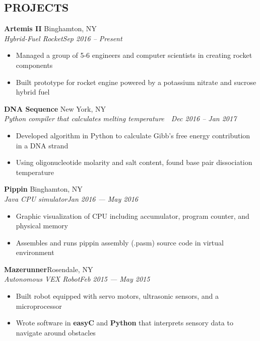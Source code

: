 \documentclass[10pt]{article}
\begin{document}
\subsection*{PROJECTS}
\spacedhrule{-0.1em}{0.5em}

\textbf{Artemis II} \hfill Binghamton, NY \\
\textit{Hybrid-Fuel Rocket}\hfill \textit{Sep 2016 – Present}
\begin{itemize}
	\item Managed a group of 5-6 engineers and computer scientists in creating rocket components
	\item Built prototype for rocket engine powered by a potassium nitrate and sucrose hybrid fuel
\end{itemize}
\ssubsecspace
\textbf{DNA Sequence} \hfill New York, NY \\
\textit{Python compiler that calculates melting temperature}  \hfill \textit{Dec 2016 – Jan 2017}                             
\begin{itemize}
	\item Developed algorithm in Python to calculate Gibb's free energy contribution in a DNA strand
	\item Using oligonucleotide molarity and salt content, found base pair dissociation temperature
\end{itemize}
\ssubsecspace
\textbf{Pippin} \hfill Binghamton, NY \\
\textit{Java CPU simulator}\hfill \textit{Jan 2016 — May 2016}                           
\begin{itemize}
	\item Graphic visualization of CPU including accumulator, program counter, and physical memory
	\item Assembles and runs pippin assembly (.pasm) source code in virtual environment
\end{itemize}
\ssubsecspace
\textbf{Mazerunner}\hfill  Rosendale, NY    \\
\textit{Autonomous VEX Robot}\hfill \textit{Feb 2015 — May 2015}
\begin{itemize}
	\item Built robot equipped with servo motors, ultrasonic sensors, and a microprocessor
	\item Wrote software in \textbf{easyC} and \textbf{Python} that interprets sensory data to navigate around obstacles
\end{itemize}
\end{document}
